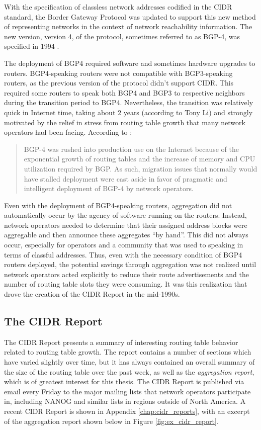 With the specification of classless network addresses codified in the CIDR
standard, the Border Gateway Protocol was updated to support this new method of
representing networks in the context of network reachability information. The
new version, version 4, of the protocol, sometimes referred to as BGP-4, was
specified in 1994 \cite{rfc1654}.

The deployment of BGP4 required software and sometimes hardware upgrades to
routers. BGP4-speaking routers were not compatible with BGP3-speaking routers,
as the previous version of the protocol didn't support CIDR. This required some
routers to speak both BGP4 and BGP3 to respective neighbors during the
transition period to BGP4. Nevertheless, the transition was relatively quick in
Internet time, taking about 2 years (according to Tony Li) and strongly
motivated by the relief in stress from routing table growth that many network
operators had been facing. According to \cite{rfc1773}:

\begin{quote} BGP-4 was rushed into production use on the Internet because of
the exponential growth of routing tables and the increase of memory and CPU
utilization required by BGP.  As such, migration issues that normally would
have stalled deployment were cast aside in favor of pragmatic and intelligent
deployment of BGP-4 by network operators.
\end{quote}

Even with the deployment of BGP4-speaking routers, aggregation did not
automatically occur by the agency of software running on the routers. Instead,
network operators needed to determine that their assigned address blocks were
aggregable and then announce these aggregates ``by hand''. This did not always
occur, especially for operators and a community that was used to speaking in
terms of classful addresses. Thus, even with the necessary condition of BGP4
routers deployed, the potential savings through aggregation was not realized
until network operators acted explicitly to reduce their route advertisements
and the number of routing table slots they were consuming. It was this
realization that drove the creation of the CIDR Report in the mid-1990s.

\subsection{The CIDR Report}

The CIDR Report presents a summary of interesting routing table behavior
related to routing table growth. The report contains a number of sections which
have varied slightly over time, but it has always contained an overall summary
of the size of the routing table over the past week, as well as the
\emph{aggregation report}, which is of greatest interest for this thesis. The
CIDR Report is published via email every Friday to the major mailing lists that
network operators participate in, including NANOG and similar lists in regions
outside of North America. A recent CIDR Report is shown in Appendix
\ref{chap:cidr_reports}, with an excerpt of the aggregation report shown below
in Figure \ref{fig:ex_cidr_report}.

